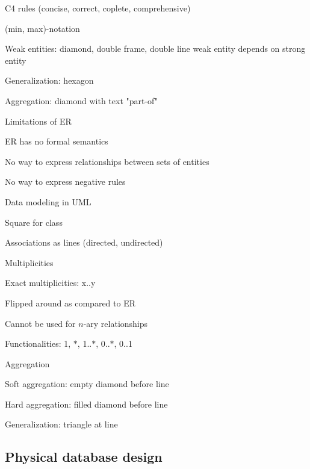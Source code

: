 		\item C4 rules (concise, correct, coplete, comprehensive)
	\enumend
	\item (min, max)-notation
	\item Weak entities: diamond, double frame, double line \arrow weak entity depends on strong entity
	\item Generalization: hexagon
	\item Aggregation: diamond with text "part-of"
	\item Limitations of ER
	\enumstart
		\item ER has no formal semantics
		\item No way to express relationships between sets of entities
		\item No way to express negative rules
	\enumend
	\item Data modeling in UML
	\enumstart
		\item Square for class
		\item Associations as lines (directed, undirected)
		\item Multiplicities
		\enumstart
			\item Exact multiplicities: x..y
			\item Flipped around as compared to ER
			\item Cannot be used for $n$-ary relationships
		\enumend
		\item Functionalities: 1, $*$, 1..$*$, 0..$*$, 0..1
		\item Aggregation
		\enumstart
			\item Soft aggregation: empty diamond before line
			\item Hard aggregation: filled diamond before line
		\enumend
		\item Generalization: triangle at line
	\enumend
\enumend

\subsection{Physical database design}
\enumstart
	\item 
\enumend
